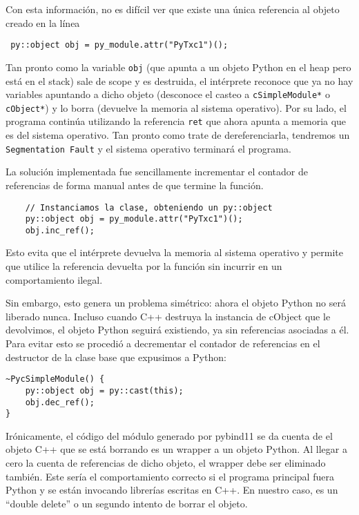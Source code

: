 Con esta información, no es difícil ver que existe una única referencia al
objeto creado en la línea

\begin{verbatim}
 py::object obj = py_module.attr("PyTxc1")();
\end{verbatim}

Tan pronto como la variable \verb!obj! (que apunta a un objeto Python en el
heap pero está en el stack) sale de scope y es destruida, el intérprete
reconoce que ya no hay variables apuntando a dicho objeto (desconoce el casteo
a \verb!cSimpleModule*! o \verb!cObject*!) y lo borra (devuelve la memoria al
sistema operativo). Por su lado, el programa \omnetpp{} continúa utilizando la
referencia \verb!ret! que ahora apunta a memoria que es del sistema operativo.
Tan pronto como trate de dereferenciarla, tendremos un \verb!Segmentation Fault!
y el sistema operativo terminará el programa.

La solución implementada fue sencillamente incrementar el contador de
referencias de forma manual antes de que termine la función. 

\begin{verbatim}
    // Instanciamos la clase, obteniendo un py::object
    py::object obj = py_module.attr("PyTxc1")();
    obj.inc_ref();
\end{verbatim}

Esto evita que el intérprete devuelva la memoria al sistema operativo y permite
que \omnetpp{} utilice la referencia devuelta por la función sin incurrir en un
comportamiento ilegal.

Sin embargo, esto genera un problema simétrico: ahora el objeto Python no será
liberado nunca. Incluso cuando C++ destruya la instancia de cObject que le
devolvimos, el objeto Python seguirá existiendo, ya sin referencias asociadas a
él. Para evitar esto se procedió a decrementar el contador de referencias en el
destructor de la clase base que expusimos a Python:

\begin{verbatim}
~PycSimpleModule() {
    py::object obj = py::cast(this);
    obj.dec_ref();
} 
\end{verbatim}

Irónicamente, el código del módulo generado por pybind11 se da cuenta de el
objeto C++ que se está borrando es un wrapper a un objeto Python. Al llegar a
cero la cuenta de referencias de dicho objeto, el wrapper debe ser eliminado
también. Este sería el comportamiento correcto si el programa principal fuera
Python y se están invocando librerías escritas en C++. En nuestro caso, es un
``double delete'' o un segundo intento de borrar el objeto.

